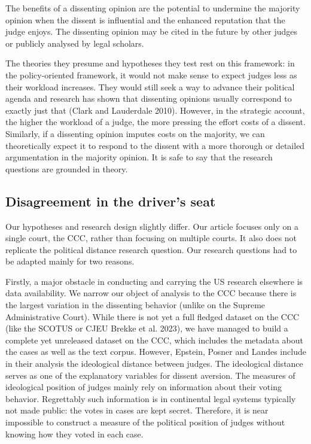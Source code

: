 \documentclass[
  11pt,
]{article}
\begin{document}
The benefits of a dissenting opinion are the potential to undermine the
majority opinion when the dissent is influential and the enhanced
reputation that the judge enjoys. The dissenting opinion may be cited in
the future by other judges or publicly analysed by legal scholars.

The theories they presume and hypotheses they test rest on this
framework: in the policy-oriented framework, it would not make sense to
expect judges less as their workload increases. They would still seek a
way to advance their political agenda and research has shown that
dissenting opinions usually correspond to exactly just that (Clark and
Lauderdale 2010). However, in the strategic account, the higher the
workload of a judge, the more pressing the effort costs of a dissent.
Similarly, if a dissenting opinion imputes costs on the majority, we can
theoretically expect it to respond to the dissent with a more thorough
or detailed argumentation in the majority opinion. It is safe to say
that the research questions are grounded in theory.

\hypertarget{disagreement-in-the-drivers-seat}{%
\subsection{Disagreement in the driver's
seat}\label{disagreement-in-the-drivers-seat}}

Our hypotheses and research design slightly differ. Our article focuses
only on a single court, the CCC, rather than focusing on multiple
courts. It also does not replicate the political distance research
question. Our research questions had to be adapted mainly for two
reasons.

Firstly, a major obstacle in conducting and carrying the US research
elsewhere is data availability. We narrow our object of analysis to the
CCC because there is the largest variation in the dissenting behavior
(unlike on the Supreme Administrative Court). While there is not yet a
full fledged dataset on the CCC (like the SCOTUS or CJEU Brekke et al.
2023), we have managed to build a complete yet unreleased dataset on the
CCC, which includes the metadata about the cases as well as the text
corpus. However, Epstein, Posner and Landes include in their analysis
the ideological distance between judges. The ideological distance serves
as one of the explanatory variables for dissent aversion. The measures
of ideological position of judges mainly rely on information about their
voting behavior. Regrettably such information is in continental legal
systems typically not made public: the votes in cases are kept secret.
Therefore, it is near impossible to construct a measure of the political
position of judges without knowing how they voted in each case.
\end{document}
